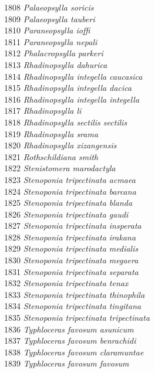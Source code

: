\documentclass[
]{article}
\begin{document}
1808 \emph{Palaeopsylla soricis}\\
1809 \emph{Palaeopsylla tauberi}\\
1810 \emph{Paraneopsylla ioffi}\\
1811 \emph{Paraneopsylla nepali}\\
1812 \emph{Phalacropsylla parkeri}\\
1813 \emph{Rhadinopsylla dahurica}\\
1814 \emph{Rhadinopsylla integella caucasica}\\
1815 \emph{Rhadinopsylla integella dacica}\\
1816 \emph{Rhadinopsylla integella integella}\\
1817 \emph{Rhadinopsylla li}\\
1818 \emph{Rhadinopsylla sectilis sectilis}\\
1819 \emph{Rhadinopsylla srama}\\
1820 \emph{Rhadinopsylla xizangensis}\\
1821 \emph{Rothschildiana smith}\\
1822 \emph{Stenistomera marodactyla}\\
1823 \emph{Stenoponia tripectinata acmaea}\\
1824 \emph{Stenoponia tripectinata barcana}\\
1825 \emph{Stenoponia tripectinata blanda}\\
1826 \emph{Stenoponia tripectinata gaudi}\\
1827 \emph{Stenoponia tripectinata insperata}\\
1828 \emph{Stenoponia tripectinata irakana}\\
1829 \emph{Stenoponia tripectinata medialis}\\
1830 \emph{Stenoponia tripectinata megaera}\\
1831 \emph{Stenoponia tripectinata separata}\\
1832 \emph{Stenoponia tripectinata tenax}\\
1833 \emph{Stenoponia tripectinata thinophila}\\
1834 \emph{Stenoponia tripectinata tingitana}\\
1835 \emph{Stenoponia tripectinata tripectinata}\\
1836 \emph{Typhloceras favosum asunicum}\\
1837 \emph{Typhloceras favosum benrachidi}\\
1838 \emph{Typhloceras favosum claramuntae}\\
1839 \emph{Typhloceras favosum favosum}\\
\end{document}
